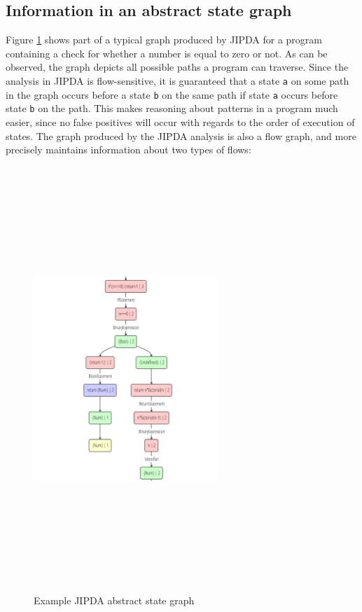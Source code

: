 \subsection{Information in an abstract state graph}

Figure \ref{fig:JipdaGraph} shows part of a typical graph produced by JIPDA for a program containing a check for whether a number is equal to zero or not. As can be observed, the graph depicts all possible paths a program can traverse. Since the analysis in JIPDA is flow-sensitive, it is guaranteed that a state \texttt{a} on some path in the graph occurs before a state \texttt{b} on the same path if state \texttt{a} occurs before state \texttt{b} on the path. This makes reasoning about patterns in a program much easier, since no false positives will occur with regards to the order of execution of states. The graph produced by the JIPDA analysis is also a flow graph, and more precisely maintains information about two types of flows:

\begin{figure}[!ht]
    \centering
      \includegraphics[width=262px, height=606px, keepaspectratio]{images/JipdaGraph} 
      \caption{Example JIPDA abstract state graph}
    \label{fig:JipdaGraph}
\end{figure}

